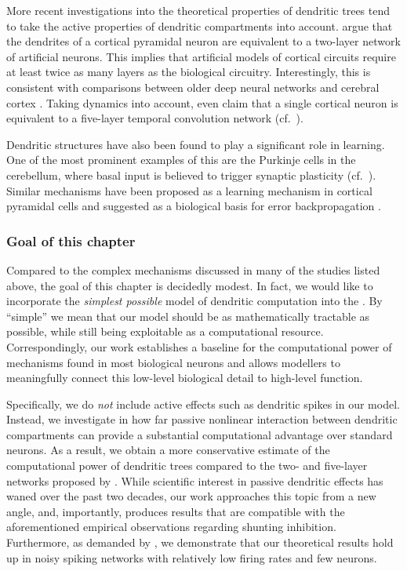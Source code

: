 More recent investigations into the theoretical properties of dendritic trees tend to take the active properties of dendritic compartments into account.
 argue that the dendrites of a cortical pyramidal neuron are equivalent to a two-layer network of artificial neurons.
This implies that artificial models of cortical circuits require at least twice as many layers as the biological circuitry.
Interestingly, this is consistent with comparisons between older deep neural networks and cerebral cortex \citep[e.g.,][]{guclu2015deep}.
Taking dynamics into account, \citet{beniaguev2021single} even claim that a single cortical neuron is equivalent to a five-layer temporal convolution network (cf.~).

Dendritic structures have also been found to play a significant role in learning.
One of the most prominent examples of this are the Purkinje cells in the cerebellum, where basal input is believed to trigger synaptic plasticity (cf.~).
Similar mechanisms have been proposed as a learning mechanism in cortical pyramidal cells and suggested as a biological basis for error backpropagation \citep{richards2019dendritic,richards2019deep}.

\subsubsection{Goal of this chapter}
Compared to the complex mechanisms discussed in many of the studies listed above, the goal of this chapter is decidedly modest.
In fact, we would like to incorporate the \emph{simplest possible} model of dendritic computation into the \NEF.
By \enquote{simple} we mean that our model should be as mathematically tractable as possible, while still being exploitable as a computational resource.
Correspondingly, our work establishes a baseline for the computational power of mechanisms found in most biological neurons and allows modellers to meaningfully connect this low-level biological detail to high-level function.

Specifically, we do \emph{not} include active effects such as dendritic spikes in our model.
Instead, we investigate in how far passive nonlinear interaction between dendritic compartments can provide a substantial computational advantage over standard \LIF neurons.
As a result, we obtain a more conservative estimate of the computational power of dendritic trees compared to the two- and five-layer networks proposed by \citet{poirazi2003pyramidal,beniaguev2021single}.
While scientific interest in passive dendritic effects has waned over the past two decades, our work approaches this topic from a new angle, and, importantly, produces results that are compatible with the aforementioned empirical observations regarding shunting inhibition.
Furthermore, as demanded by \citet{london2005dendritic}, we demonstrate that our theoretical results hold up in noisy spiking networks with relatively low firing rates and few neurons.

